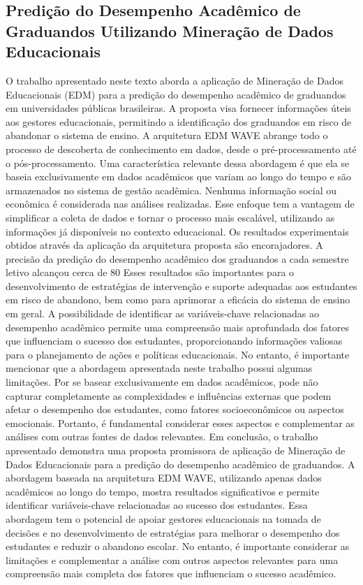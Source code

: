 \documentclass[conference]{IEEEtran}
\begin{document}
\subsection{Predição do Desempenho Acadêmico de Graduandos Utilizando Mineração de Dados Educacionais\cite{b2}}
O trabalho apresentado neste texto aborda a aplicação de Mineração de Dados Educacionais (EDM) para a predição do desempenho acadêmico de graduandos em universidades públicas brasileiras. A proposta visa fornecer informações úteis aos gestores educacionais, permitindo a identificação dos graduandos em risco de abandonar o sistema de ensino. A arquitetura EDM WAVE abrange todo o processo de descoberta de conhecimento em dados, desde o pré-processamento até o pós-processamento.
Uma característica relevante dessa abordagem é que ela se baseia exclusivamente em dados acadêmicos que variam ao longo do tempo e são armazenados no sistema de gestão acadêmica. Nenhuma informação social ou econômica é considerada nas análises realizadas. Esse enfoque tem a vantagem de simplificar a coleta de dados e tornar o processo mais escalável, utilizando as informações já disponíveis no contexto educacional.
Os resultados experimentais obtidos através da aplicação da arquitetura proposta são encorajadores. A precisão da predição do desempenho acadêmico dos graduandos a cada semestre letivo alcançou cerca de 80%
Esses resultados são importantes para o desenvolvimento de estratégias de intervenção e suporte adequadas aos estudantes em risco de abandono, bem como para aprimorar a eficácia do sistema de ensino em geral. A possibilidade de identificar as variáveis-chave relacionadas ao desempenho acadêmico permite uma compreensão mais aprofundada dos fatores que influenciam o sucesso dos estudantes, proporcionando informações valiosas para o planejamento de ações e políticas educacionais.
No entanto, é importante mencionar que a abordagem apresentada neste trabalho possui algumas limitações. Por se basear exclusivamente em dados acadêmicos, pode não capturar completamente as complexidades e influências externas que podem afetar o desempenho dos estudantes, como fatores socioeconômicos ou aspectos emocionais. Portanto, é fundamental considerar esses aspectos e complementar as análises com outras fontes de dados relevantes.
Em conclusão, o trabalho apresentado demonstra uma proposta promissora de aplicação de Mineração de Dados Educacionais para a predição do desempenho acadêmico de graduandos. A abordagem baseada na arquitetura EDM WAVE, utilizando apenas dados acadêmicos ao longo do tempo, mostra resultados significativos e permite identificar variáveis-chave relacionadas ao sucesso dos estudantes. Essa abordagem tem o potencial de apoiar gestores educacionais na tomada de decisões e no desenvolvimento de estratégias para melhorar o desempenho dos estudantes e reduzir o abandono escolar. No entanto, é importante considerar as limitações e complementar a análise com outros aspectos relevantes para uma compreensão mais completa dos fatores que influenciam o sucesso acadêmico.
\end{document}

